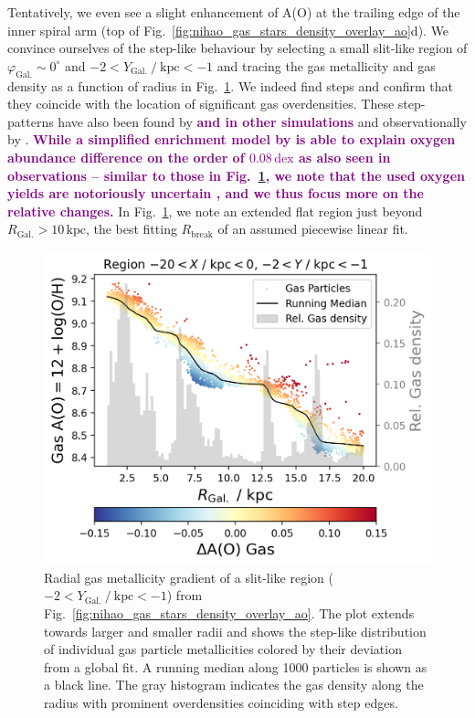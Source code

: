 \documentclass[twocolumn,apj,numberedappendix,appendixfloats,twocolappendix]{openjournal}
\newcommand{\adjusted}[1]{\textbf{\textcolor{purple}{#1}}}
\begin{document}
\begin{CJK*}{UTF8}{gbsn}
Tentatively, we even see a slight enhancement of A(O) at the trailing edge of the inner spiral arm (top of Fig.~\ref{fig:nihao_gas_stars_density_overlay_ao}d). We convince ourselves of the step-like behaviour by selecting a small slit-like region of $\varphi_\mathrm{Gal.} \sim 0^\circ$ and $-2 < Y_\mathrm{Gal.}~/~\mathrm{kpc} < -1$ and tracing the gas metallicity and gas density as a function of radius in Fig.~\ref{fig:region_r_ao_gas_density}. We indeed find steps and confirm that they coincide with the location of significant gas overdensities. These step-patterns have also been found by \citet{Grand2015} \adjusted{and \citet{Orr2023} in other simulations} and observationally by \citet{Ho2017c}. \adjusted{While a simplified enrichment model by \citet{Ho2017c} is able to explain oxygen abundance difference on the order of $0.08\,\mathrm{dex}$ as also seen in observations -- similar to those in Fig.~\ref{fig:region_r_ao_gas_density}, we note that the used oxygen yields are notoriously uncertain \citep[see][and references therein]{Vincenzo2016a}, and we thus focus more on the relative changes.} In Fig.~\ref{fig:region_r_ao_gas_density}, we note an extended flat region just beyond $R_\mathrm{Gal.} > 10\,\mathrm{kpc}$, the best fitting $R_\mathrm{break}$ of an assumed piecewise linear fit.

\begin{figure}
    \centering
    \includegraphics[width=\columnwidth]{figures/region_r_ao_gas_density.png}
    \caption{Radial gas metallicity gradient of a slit-like region ($-2 < Y_\mathrm{Gal.}~/~\mathrm{kpc} < -1$) from Fig.~\ref{fig:nihao_gas_stars_density_overlay_ao}. The plot extends towards larger and smaller radii and shows the step-like distribution of individual gas particle metallicities colored by their deviation from a global fit. A running median along 1000 particles is shown as a black line. The gray histogram indicates the gas density along the radius with prominent overdensities coinciding with step edges.}
    \label{fig:region_r_ao_gas_density}
\end{figure}


\end{CJK*}
\end{document}
